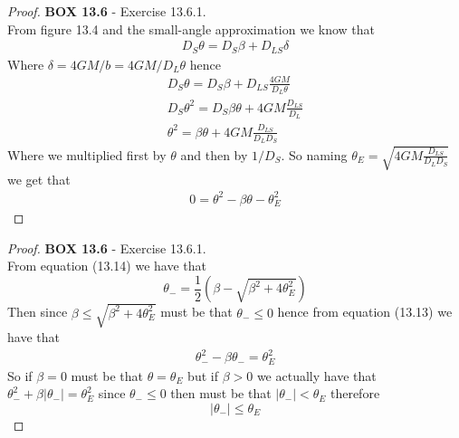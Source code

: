 \documentclass[11pt]{article}
\theoremstyle{definition}
\begin{document}
\cleardoublepage
\begin{proof}{\textbf{BOX 13.6} - Exercise 13.6.1.}\\
From figure 13.4 and the small-angle approximation we know that
\begin{align*}
    D_S\theta = D_S\beta + D_{LS}\delta
\end{align*}
Where $\delta = 4GM/b = 4GM/D_L\theta$ hence
\begin{align*}
    D_S\theta = D_S\beta + D_{LS}\frac{4GM}{D_L\theta}\\
    D_S\theta^2 = D_S\beta\theta + 4GM \frac{D_{LS}}{D_L}\\
    \theta^2 = \beta\theta + 4GM \frac{D_{LS}}{D_LD_S}
\end{align*}
Where we multiplied first by $\theta$ and then by $1/D_S$.
So naming $\theta_E = \sqrt{4GM \frac{D_{LS}}{D_LD_S}}$ we get that
\begin{align*}
    0 = \theta^2 - \beta\theta - \theta_E^2
\end{align*}
\end{proof}
\begin{proof}{\textbf{BOX 13.6} - Exercise 13.6.1.}\\
From equation (13.14) we have that
$$\theta_{-} = \frac{1}{2}(\beta - \sqrt{\beta^2 + 4\theta_E^2})$$
Then since $\beta \leq \sqrt{\beta^2 + 4\theta_E^2}$ must be that
$\theta_{-} \leq 0$ hence from equation (13.13) we have that
\begin{align*}
    \theta_{-}^2 - \beta\theta_{-} = \theta_E^2
\end{align*}
So if $\beta = 0$ must be that $\theta = \theta_E$ but if $\beta > 0$ we
actually have that $\theta_{-}^2 + \beta|\theta_{-}| = \theta_E^2$ since
$\theta_- \leq 0$ then must be that $|\theta_-| < \theta_E$ therefore 
$$|\theta_-| \leq \theta_E$$
\end{proof}
\end{document}

